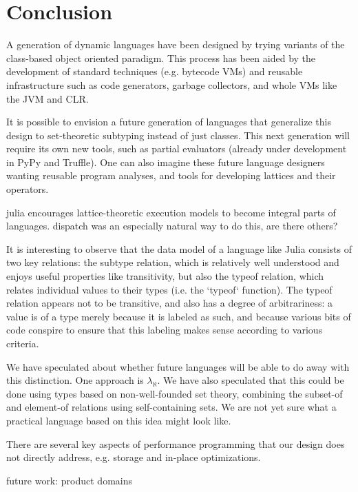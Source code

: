 \chapter{Conclusion}




A generation of dynamic languages have been designed by trying variants of
the class-based object oriented paradigm. This process has been aided by
the development of standard techniques (e.g. bytecode VMs) and reusable
infrastructure such as code generators, garbage collectors, and whole VMs
like the JVM and CLR.

It is possible to envision a future generation of languages that generalize
this design to set-theoretic subtyping instead of just classes. This next
generation will require its own new tools, such as partial evaluators (already
under development in PyPy and Truffle). One can also imagine these future
language designers wanting reusable program analyses, and tools for
developing lattices and their operators.

julia encourages lattice-theoretic execution models to become integral
parts of languages. dispatch was an especially natural way to do this,
are there others?


It is interesting to observe that the data model of a language like Julia
consists of two key relations: the subtype relation, which is relatively
well understood and enjoys useful properties like transitivity, but also
the typeof relation, which relates individual values to their types
(i.e. the `typeof` function). The typeof relation appears not to be
transitive, and also has a degree of arbitrariness: a value is of a type
merely because it is labeled as such, and because various bits of code
conspire to ensure that this labeling makes sense according to various
criteria.

We have speculated about whether future languages will be able to do away
with this distinction. One approach is $\lambda_{\aleph}$. We have also
speculated that this could be done using types based on non-well-founded
set theory, combining the subset-of and element-of relations using
self-containing sets. We are not yet sure what a practical language based
on this idea might look like.


There are several key aspects of performance programming that our design
does not directly address, e.g.  storage and in-place optimizations.

future work:
product domains
